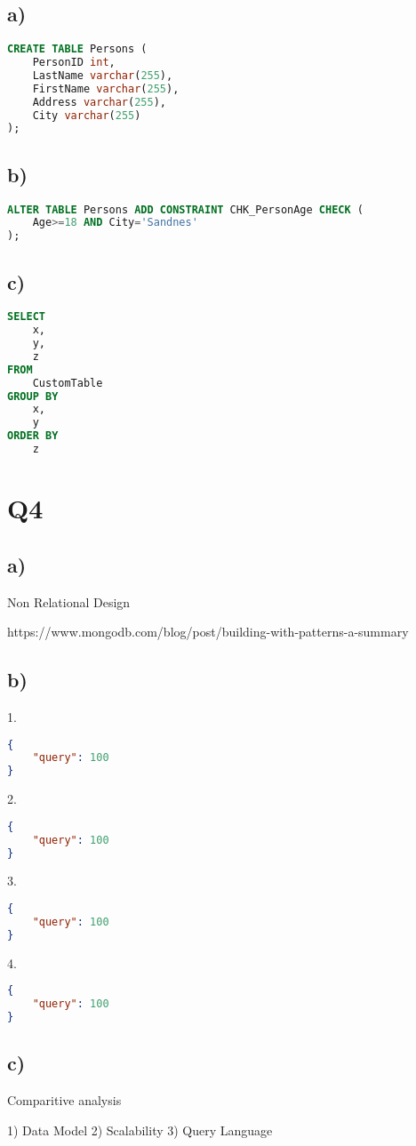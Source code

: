\documentclass{article}
\begin{document}
\subsection*{\small a)}

\begin{lstlisting}[language=sql]
CREATE TABLE Persons (
    PersonID int,
    LastName varchar(255),
    FirstName varchar(255),
    Address varchar(255),
    City varchar(255)
);
\end{lstlisting}


\subsection*{\small b)}

\begin{lstlisting}[language=sql]
ALTER TABLE Persons ADD CONSTRAINT CHK_PersonAge CHECK (
    Age>=18 AND City='Sandnes'
);
\end{lstlisting}

\subsection*{\small c)}

\begin{lstlisting}[language=sql]
SELECT 
    x,
    y,
    z
FROM 
    CustomTable 
GROUP BY 
    x,
    y
ORDER BY
    z
\end{lstlisting}

\pagebreak 
\section*{Q4}

\subsection*{\small a)}

Non Relational Design

https://www.mongodb.com/blog/post/building-with-patterns-a-summary

\subsection*{\small b)}

\hspace{0cm}1.
\begin{lstlisting}[language=json]
{
    "query": 100
} 
\end{lstlisting} 
\hspace{0cm}2.
\begin{lstlisting}[language=json]
{                   
    "query": 100
}
\end{lstlisting}
\hspace{0cm}3. 
\begin{lstlisting}[language=json]
{
    "query": 100
}
\end{lstlisting}
\hspace{0cm}4. 
\begin{lstlisting}[language=json]
{
    "query": 100
}
\end{lstlisting}

\subsection*{\small c)}

Comparitive analysis

1) Data Model
2) Scalability
3) Query Language
\end{document}

